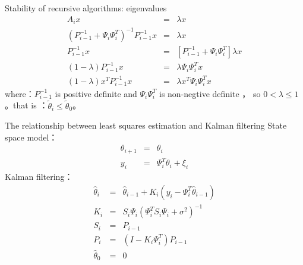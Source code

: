 \begin{frame}{ Stability of recursive algorithms: eigenvalues }
\begin{eqnarray*}
A_i x &=& \lambda x \\
(P_{i-1}^{-1}+\Psi_i\Psi_i^T)^{-1} P_{i-1}^{-1}x &=& \lambda x \\
P_{i-1}^{-1}x &=& [P_{i-1}^{-1}+\Psi_i\Psi_i^T]\lambda x \\
(1-\lambda)P_{i-1}^{-1}x &=& \lambda \Psi_i\Psi_i^T x \\
(1-\lambda) x^T P_{i-1}^{-1}x &=& \lambda x^T \Psi_i\Psi_i^T x 
\end{eqnarray*}
where：$ P_{i-1}^{-1} $ is positive definite and $\Psi_i\Psi_i^T$ is non-negtive definite ， so $0<\lambda \leq 1$。that is ：$\tilde\theta_i\leq\tilde\theta_0$。
\end{frame}

\begin{frame}{ The relationship between least squares estimation and Kalman filtering }
State space model：
\begin{eqnarray*}
\theta_{i+1} &=& \theta_i \\
y_i &=& \Psi_i^T\theta_i +\xi_i
\end{eqnarray*}
Kalman filtering：
\begin{eqnarray*}
\hat\theta_i &=& \hat\theta_{i-1} +K_i(y_i-\Psi_i^T\hat\theta_{i-1})  \\
K_i &=& S_i\Psi_i(\Psi_i^T S_i\Psi_i+\sigma^2)^{-1}  \\
S_i &=&  P_{i-1} \\
P_i &=&   (I-K_i\Psi_i^T)P_{i-1} \\
\hat\theta_0 &=& 0 \\
\end{eqnarray*}
\end{frame}



